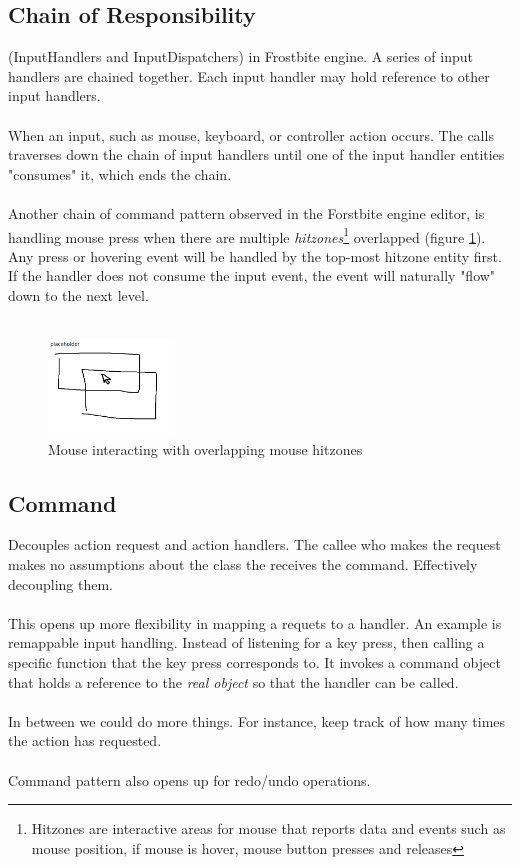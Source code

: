 \documentclass[10pt,letterpaper]{article}
\begin{document}
\begin{multicols}{2}
\subsection{Chain of Responsibility}

(InputHandlers and InputDispatchers) in Frostbite engine. A series of input handlers are chained together. Each input handler may hold reference to other input handlers.\\
\\
When an input, such as mouse, keyboard, or controller action occurs. The calls traverses down the chain of input handlers until one of the input handler entities "consumes" it, which ends the chain.\\
\\

Another chain of command pattern observed in the Forstbite engine editor, is handling mouse press when there are multiple \textit{hitzones}\footnote{Hitzones are interactive areas for mouse that reports data and events such as mouse position, if mouse is hover, mouse button presses and releases} overlapped (figure \ref{fig:chainofcommand-mousezones}). Any press or hovering event will be handled by the top-most hitzone entity first. If the handler does not consume the input event, the event will naturally "flow" down to the next level.\\
\\
\begin{figure}[H]
	\centering
	\includegraphics[width=0.3\textwidth]{assets/chainofcommand_mousezones}
	\caption{Mouse interacting with overlapping mouse hitzones}
	\label{fig:chainofcommand-mousezones}
\end{figure}

\subsection{Command}

Decouples action request and action handlers. The callee who makes the request makes no assumptions about the class the receives the command. Effectively decoupling them.\\
\\
This opens up more flexibility in mapping a requets to a handler. An example is remappable input handling. Instead of listening for a key press, then calling a specific function that the key press corresponds to. It invokes a command object that holds a reference to the \textit{real object} so that the handler can be called.\\
\\
In between we could do more things. For instance, keep track of how many times the action has requested.\\
\\
Command pattern also opens up for redo/undo operations.


\end{multicols}
\end{document}
